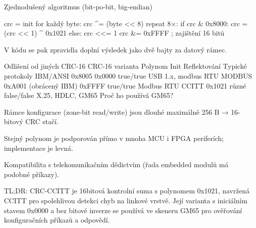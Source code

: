 Zjednodušený algoritmus (bit-po-bit, big-endian)

crc = init
for každý byte:
    crc ^= (byte << 8)
    repeat 8×:
        if crc & 0x8000:
            crc = (crc << 1) ^ 0x1021
        else:
            crc <<= 1
crc &= 0xFFFF   ; zajištění 16 bitů

    V kódu se pak zpravidla doplní výsledek jako dvě bajty za datový rámec.

Odlišení od jiných CRC-16
CRC-16 varianta	Polynom	Init	Reflektování	Typické protokoly
IBM/ANSI	0x8005	0x0000	true/true	USB 1.x, modbus RTU
MODBUS	0xA001 (obrácený IBM)	0xFFFF	true/true	Modbus RTU
CCITT	0x1021	různé	false/false	X.25, HDLC, GM65
Proč ho používá GM65?

    Rámce konfigurace (zone-bit read/write) jsou dlouhé maximálně 256 B → 16-bitový CRC stačí.

    Stejný polynom je podporován přímo v mnoha MCU i FPGA periferích; implementace je levná.

    Kompatibilita s telekomunikačním dědictvím (řada embedded modulů má podobné příkazy).

TL;DR:
CRC-CCITT je 16bitová kontrolní suma s polynomem 0x1021, navržená CCITT pro spolehlivou detekci chyb na linkové vrstvě. Její varianta s iniciálním stavem 0x0000 a bez bitové inverze se používá ve skeneru GM65 pro ověřování konfiguračních příkazů a odpovědí.
